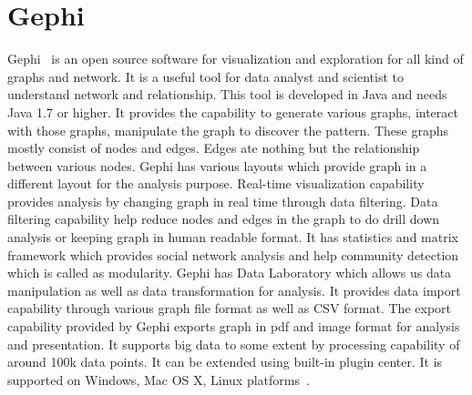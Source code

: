 \section{Gephi}
Gephi~\cite{hid-sp18-402-gephi} is an open source software for
visualization and exploration for all kind of graphs and network. It
is a useful tool for data analyst and scientist to understand network
and relationship. This tool is developed in Java and needs Java 1.7 or
higher. It provides the capability to generate various graphs, interact
with those graphs, manipulate the graph to discover the pattern. These
graphs mostly consist of nodes and edges. Edges ate nothing but the
relationship between various nodes. Gephi has various layouts which
provide graph in a different layout for the analysis purpose. Real-time
visualization capability provides analysis by changing graph in real
time through data filtering. Data filtering capability help reduce
nodes and edges in the graph to do drill down analysis or keeping
graph in human readable format.  It has statistics and matrix framework
which provides social network analysis and help community detection
which is called as modularity. Gephi has Data Laboratory which allows us data manipulation as
well as data transformation for analysis. It provides data import
capability through various graph file format as well as CSV format. The export
capability provided by Gephi exports graph in pdf and image format for
analysis and presentation. It supports big data to some extent by
processing capability of around 100k data points. It can be extended
using built-in plugin center. It is supported on Windows, Mac OS X,
Linux platforms~\cite{hid-sp18-402-gephiF}.
